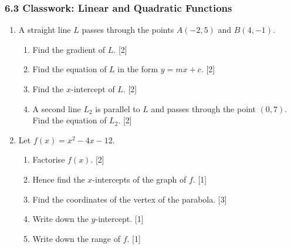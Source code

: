 \documentclass[12pt, twoside]{article}
\begin{document}
\subsubsection*{6.3 Classwork: Linear and Quadratic Functions}

\begin{enumerate}[itemsep=0.2cm]

\item A straight line $L$ passes through the points $A(-2, 5)$ and $B(4, -1)$.

\begin{enumerate}[itemsep=0.15cm]
  \item Find the gradient of $L$. \hfill [2]
  \item Find the equation of $L$ in the form $y = mx + c$. \hfill [2]
  \item Find the $x$-intercept of $L$. \hfill [2]
  \item A second line $L_2$ is parallel to $L$ and passes through the
        point $(0, 7)$. Find the equation of $L_2$. \hfill [2]
\end{enumerate}


\newpage

\item Let $f(x) = x^2 - 4x - 12$.

\begin{enumerate}[itemsep=0.15cm]
  \item Factorise $f(x)$. \hfill [2]
  \item Hence find the $x$-intercepts of the graph of $f$. \hfill [1]
  \item Find the coordinates of the vertex of the parabola. \hfill [3]
  \item Write down the $y$-intercept. \hfill [1]
  \item Write down the range of $f$. \hfill [1]
\end{enumerate}



\end{enumerate}
\end{document}
